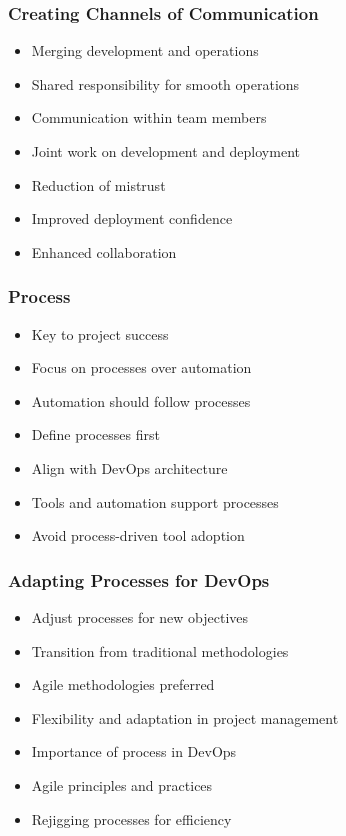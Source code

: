 \documentclass[aspectratio=169, table]{beamer}
\begin{document}
\begin{frame}
	\frametitle{Creating Channels of Communication}
	\begin{itemize}
		\item Merging development and operations
		\item Shared responsibility for smooth operations
		\item Communication within team members
		\item Joint work on development and deployment
		\item Reduction of mistrust
		\item Improved deployment confidence
		\item Enhanced collaboration
	\end{itemize}
\end{frame}

\begin{frame}
	\frametitle{Process}
	\begin{itemize}
		\item Key to project success
		\item Focus on processes over automation
		\item Automation should follow processes
		\item Define processes first
		\item Align with DevOps architecture
		\item Tools and automation support processes
		\item Avoid process-driven tool adoption
	\end{itemize}
\end{frame}

\begin{frame}
	\frametitle{Adapting Processes for DevOps}
	\begin{itemize}
		\item Adjust processes for new objectives
		\item Transition from traditional methodologies
		\item Agile methodologies preferred
		\item Flexibility and adaptation in project management
		\item Importance of process in DevOps
		\item Agile principles and practices
		\item Rejigging processes for efficiency
	\end{itemize}
\end{frame}
\end{document}
